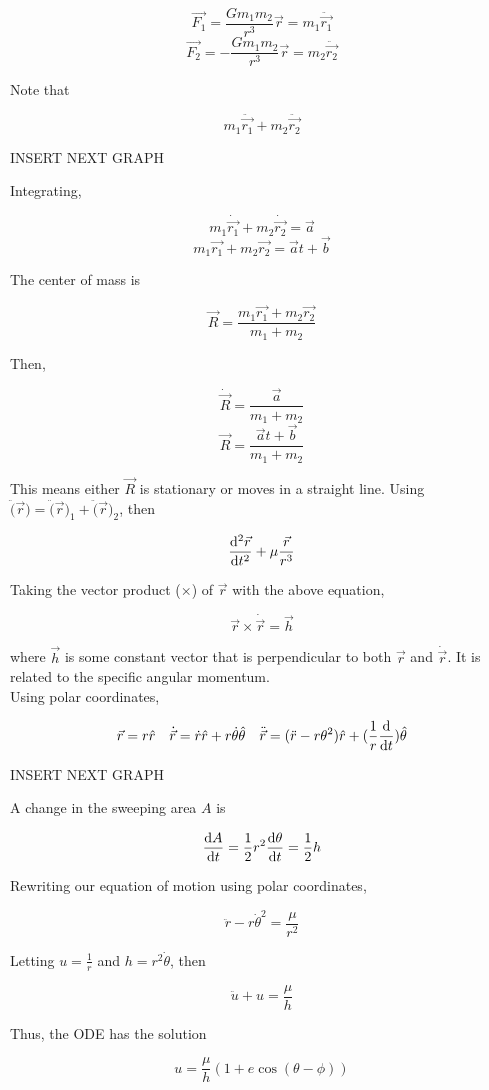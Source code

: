 \documentclass[]{article}
\begin{document}
\[\vec{F_1} = \frac{Gm_1 m_2}{r^3}\vec{r} = m_1\ddot{\vec{r_1}}\]
\[\vec{F_2} = -\frac{Gm_1 m_2}{r^3}\vec{r} = m_2\ddot{\vec{r_2}}\]

Note that 

\[m_1\ddot{\vec{r_1}} + m_2\ddot{\vec{r_2}}\]

INSERT NEXT GRAPH

Integrating,

\[m_1\dot{\vec{r_1}} + m_2\dot{\vec{r_2}} = \vec{a}\]
\[m_1\vec{r_1} + m_2\vec{r_2} = \vec{a}t + \vec{b}\]

The center of mass is 

\[\vec{R} = \frac{m_1\vec{r_1}+m_2\vec{r_2}}{m_1+m_2}\]

Then, 

\[\dot{\vec{R}} = \frac{\vec{a}}{m_1+m_2}\]
\[\vec{R} = \frac{\vec{a}t + \vec{b}}{m_1+m_2}\]


This means either $\vec{R}$ is stationary or moves in a straight line. Using $\ddot(\vec{r}) = \ddot(\vec{r})_1 + \ddot(\vec{r})_2$, then

\[\dv[2]{\vec{r}}{t} + \mu \frac{\vec{r}}{r^3}\]

Taking the vector product ($\times$) of $\vec{r}$ with the above equation, 

\[\vec{r}\times \dot{\vec{r}} = \vec{h}\]

where $\vec{h}$ is some constant vector that is perpendicular to both $\vec{r}$ and $\dot{\vec{r}}$. It is related to the specific angular momentum.\\

Using polar coordinates, 

\[\vec{r} = r\hat{r} \quad \dot{\vec{r}} = \dot{r}\hat{r} + r\dot{\theta}\hat{\theta} \quad \ddot{\vec{r}} = (\ddot{r} - r\theta^2)\hat{r} + (\frac{1}{r}\dv{}{t}(r^2\theta))\hat{\theta}\]

INSERT NEXT GRAPH

A change in the sweeping area $A$ is 

\[\dv{A}{t} = \frac{1}{2}r^2 \dv{\theta}{t} = \frac{1}{2}h\]

Rewriting our equation of motion using polar coordinates,

\[\ddot{r} - r\dot{\theta}^2 = \frac{\mu}{r^2}\]

Letting $u =\frac{1}{r}$ and $h=r^2\dot{\theta}$, then

\[\ddot{u} + u = \frac{\mu}{h}\]

Thus, the ODE has the solution 

\[u = \frac{\mu}{h}(1+e\cos(\theta - \phi))\]
\end{document}
